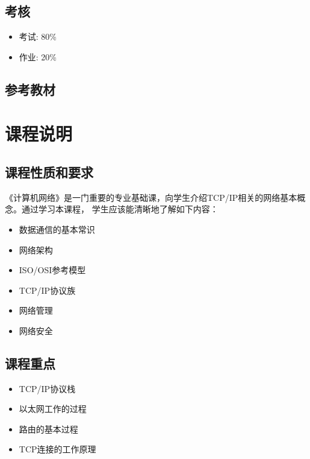 \documentclass{wx672article}
\begin{document}
\subsection{考核}
\label{sec-1-4}

\begin{itemize}
\item 考试: 80\%
\item 作业: 20\%
\end{itemize}

\subsection{参考教材}
\label{sec-1-5}

\nocite{tanenbaum2011computer,fall2011tcp,kurose2013computer,bautts2005linux,hunt2002tcp,hall2009beej}
\printbibliography[heading=none]{}

\section{课程说明}
\subsection{课程性质和要求}
\label{sec-1}

《计算机网络》是一门重要的专业基础课，向学生介绍TCP/IP相关的网络基本概念。通过学习本课程，
学生应该能清晰地了解如下内容：
\begin{itemize}
\item 数据通信的基本常识
\item 网络架构
\item ISO/OSI参考模型
\item TCP/IP协议族
\item 网络管理
\item 网络安全
\end{itemize}

\subsection{课程重点}
\label{sec-2-2}

\begin{itemize}
\item TCP/IP协议栈
\item 以太网工作的过程
\item 路由的基本过程
\item TCP连接的工作原理
\end{itemize}
\end{document}

